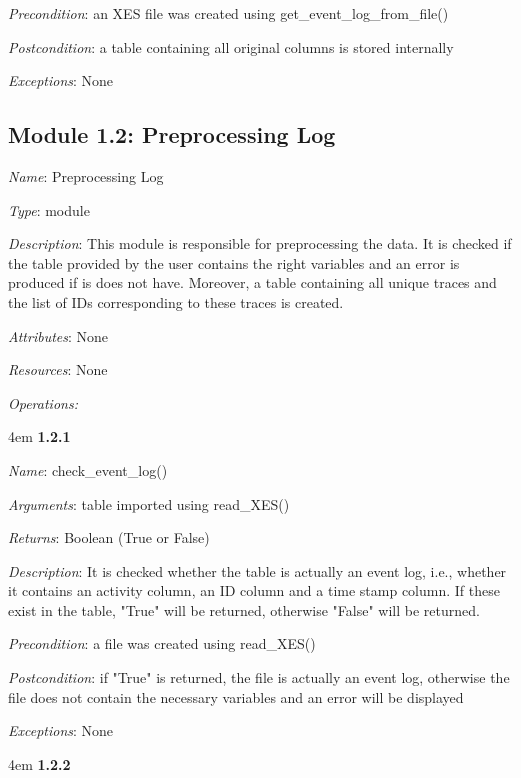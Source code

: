 \documentclass[notitlepage]{article}
\begin{document}
\begin{flushleft}
\textit{Precondition}: an XES file was created using get\_event\_log\_from\_file()

\textit{Postcondition}: a table containing all original columns is stored internally 

\textit{Exceptions}: None
\par
\endgroup

\medskip

\subsection{Module 1.2: Preprocessing Log}
\textit{Name}: Preprocessing Log

\textit{Type}: module

\textit{Description}: This module is responsible for preprocessing the data. It is checked if the table provided by the user contains the right variables and an error is produced if is does not have. Moreover, a table containing all unique traces and the list of IDs corresponding to these traces is created.

\textit{Attributes}: None

\textit{Resources}: None

\textit{Operations: }
\medskip


\par
\begingroup
\leftskip4em
\textbf{1.2.1} 

\textit{Name}: check\_event\_log()

\textit{Arguments}: table imported using read\_XES() 

\textit{Returns}: Boolean (True or False)

\textit{Description}: It is checked whether the table is actually an event log, i.e., whether it contains an activity column, an ID column and a time stamp column. If these exist in the table, "True" will be returned, otherwise "False" will be returned. 

\textit{Precondition}: a file was created using read\_XES()

\textit{Postcondition}: if "True" is returned, the file is actually an event log, otherwise the file does not contain the necessary variables and an error will be displayed

\textit{Exceptions}: None
\par
\endgroup

\medskip

\par
\begingroup
\leftskip4em
\textbf{1.2.2}


\end{flushleft}
\end{document}
